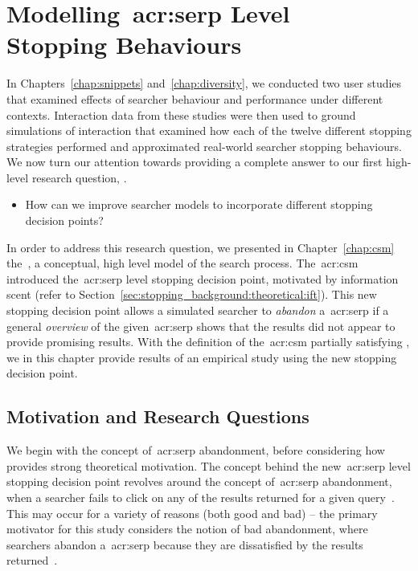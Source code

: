 
\chapter[Modelling SERP Level Stopping Behaviours]{Modelling~\gls{acr:serp} Level\\Stopping Behaviours}\label{chap:serp}
In Chapters~\ref{chap:snippets} and~\ref{chap:diversity}, we conducted two user studies that examined effects of searcher behaviour and performance under different contexts. Interaction data from these studies were then used to ground simulations of interaction that examined how each of the twelve different stopping strategies performed and approximated real-world searcher stopping behaviours. We now turn our attention towards providing a complete answer to our first high-level research question, .

\begin{itemize}
    \item[]{ How can we improve searcher models to incorporate different stopping decision points?}
\end{itemize}

In order to address this research question, we presented in Chapter~\ref{chap:csm} the~, a conceptual, high level model of the search process. The~\gls{acr:csm} introduced the~\gls{acr:serp} level stopping decision point, motivated by information scent (refer to Section~\ref{sec:stopping_background:theoretical:ift}). This new stopping decision point allows a simulated searcher to \emph{abandon} a~\gls{acr:serp} if a general \emph{overview} of the given~\gls{acr:serp} shows that the results did not appear to provide promising results. With the definition of the~\gls{acr:csm} partially satisfying , we in this chapter provide results of an empirical study using the new stopping decision point.

\section{Motivation and Research Questions}\label{sec:serp:background}
We begin with the concept of~\gls{acr:serp} abandonment, before considering how~ provides strong theoretical motivation. The concept behind the new~\gls{acr:serp} level stopping decision point revolves around the concept of~\gls{acr:serp} abandonment, when a searcher fails to click on any of the results returned for a given query~\citep{diriye2012abandonment, hassan2013serp_abandonment}. This may occur for a variety of reasons (both good and bad) -- the primary motivator for this study considers the notion of bad abandonment, where searchers abandon a~\gls{acr:serp} because they are dissatisfied by the results returned~\citep{hassan2013serp_abandonment}.

